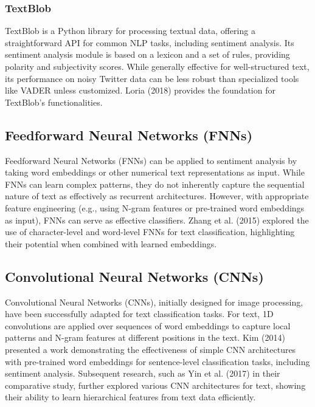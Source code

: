 \subsubsection{TextBlob}

TextBlob is a Python library for processing textual data, offering a straightforward API for common NLP tasks, including sentiment analysis. Its sentiment analysis module is based on a lexicon and a set of rules, providing polarity and subjectivity scores. While generally effective for well-structured text, its performance on noisy Twitter data can be less robust than specialized tools like VADER unless customized. Loria (2018) \cite{loria2018textblob} provides the foundation for TextBlob's functionalities.




\subsection{Feedforward Neural Networks (FNNs)}

Feedforward Neural Networks (FNNs) can be applied to sentiment analysis by taking word embeddings or other numerical text representations as input. While FNNs can learn complex patterns, they do not inherently capture the sequential nature of text as effectively as recurrent architectures. However, with appropriate feature engineering (e.g., using N-gram features or pre-trained word embeddings as input), FNNs can serve as effective classifiers. Zhang et al. (2015) \cite{zhang2015character} explored the use of character-level and word-level FNNs for text classification, highlighting their potential when combined with learned embeddings.

\subsection{Convolutional Neural Networks (CNNs)}


Convolutional Neural Networks (CNNs), initially designed for image processing, have been successfully adapted for text classification tasks. For text, 1D convolutions are applied over sequences of word embeddings to capture local patterns and N-gram features at different positions in the text. Kim (2014) \cite{kim2014convolutional} presented a work demonstrating the effectiveness of simple CNN architectures with pre-trained word embeddings for sentence-level classification tasks, including sentiment analysis. Subsequent research, such as Yin et al. (2017) \cite{yin2017comparative} in their comparative study, further explored various CNN architectures for text, showing their ability to learn hierarchical features from text data efficiently.



